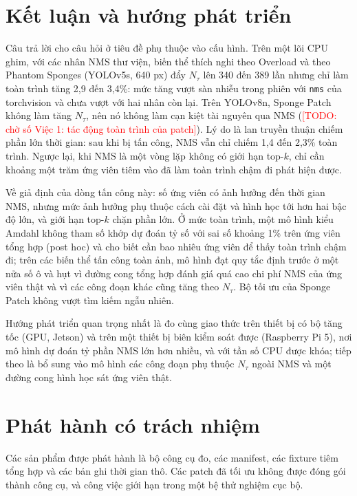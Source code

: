 \documentclass[a4paper,fleqn]{cas-dc}
\newcommand{\todo}[1]{\textcolor{red}{[TODO: #1]}}
\newcommand{\Ntau}{N_{\tau}}
\begin{document}
\section{Kết luận và hướng phát triển}
\label{sec:conclusion}
Câu trả lời cho câu hỏi ở tiêu đề phụ thuộc vào cấu hình. Trên một lõi CPU ghim, với các nhân NMS thư viện, biến thể thích nghi theo Overload và theo Phantom Sponges (YOLOv5s, 640 px) đẩy $\Ntau$ lên 340 đến 389 lần nhưng chỉ làm toàn trình tăng 2,9 đến 3,4\%: mức tăng vượt sàn nhiễu trong phiên với \texttt{nms} của torchvision và chưa vượt với hai nhân còn lại. Trên YOLOv8n, Sponge Patch không làm tăng $\Ntau$, nên nó không làm cạn kiệt tài nguyên qua NMS (\todo{chờ số Việc 1: tác động toàn trình của patch}). Lý do là lan truyền thuận chiếm phần lớn thời gian: sau khi bị tấn công, NMS vẫn chỉ chiếm 1,4 đến 2,3\% toàn trình. Ngược lại, khi NMS là một vòng lặp không có giới hạn top-$k$, chỉ cần khoảng một trăm ứng viên tiêm vào đã làm toàn trình chậm đi phát hiện được.

Về giả định của dòng tấn công này: số ứng viên có ảnh hưởng đến thời gian NMS, nhưng mức ảnh hưởng phụ thuộc cách cài đặt và hình học tới hơn hai bậc độ lớn, và giới hạn top-$k$ chặn phần lớn. Ở mức toàn trình, một mô hình kiểu Amdahl không tham số khớp dự đoán tỷ số với sai số khoảng 1\% trên ứng viên tổng hợp (post hoc) và cho biết cần bao nhiêu ứng viên để thấy toàn trình chậm đi; trên các biến thể tấn công toàn ảnh, mô hình đạt quy tắc định trước ở một nửa số ô và hụt vì đường cong tổng hợp đánh giá quá cao chi phí NMS của ứng viên thật và vì các công đoạn khác cũng tăng theo $\Ntau$. Bộ tối ưu của Sponge Patch không vượt tìm kiếm ngẫu nhiên.

Hướng phát triển quan trọng nhất là đo cùng giao thức trên thiết bị có bộ tăng tốc (GPU, Jetson) và trên một thiết bị biên kiểm soát được (Raspberry Pi 5), nơi mô hình dự đoán tỷ phần NMS lớn hơn nhiều, và với tần số CPU được khóa; tiếp theo là bổ sung vào mô hình các công đoạn phụ thuộc $\Ntau$ ngoài NMS và một đường cong hình học sát ứng viên thật.

\FloatBarrier
\section*{Phát hành có trách nhiệm}
Các sản phẩm được phát hành là bộ công cụ đo, các manifest, các fixture tiêm tổng hợp và các bản ghi thời gian thô. Các patch đã tối ưu không được đóng gói thành công cụ, và công việc giới hạn trong một bệ thử nghiệm cục bộ.
\end{document}
